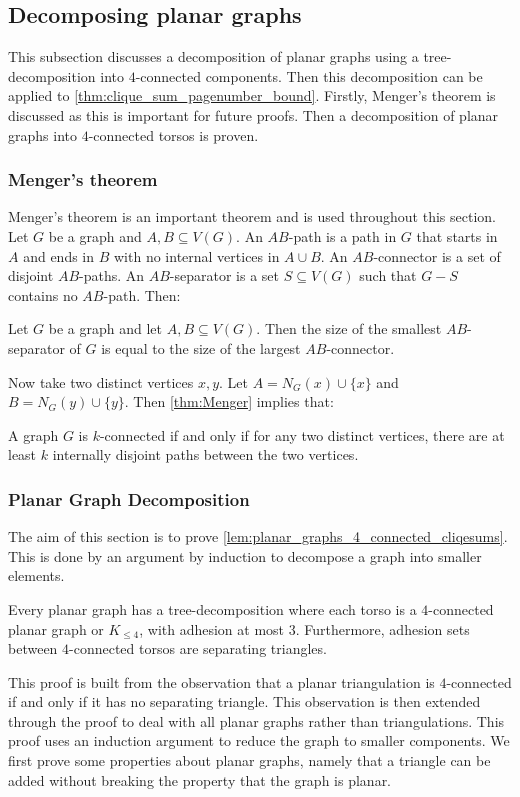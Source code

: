 \subsection{Decomposing planar graphs}
This subsection discusses a decomposition of planar graphs using a tree-decomposition into $4$-connected components. Then this decomposition can be applied to \cref{thm:clique_sum_pagenumber_bound}. Firstly, Menger's theorem is discussed as this is important for future proofs. Then a decomposition of planar graphs into $4$-connected torsos is proven.

\subsubsection{Menger's theorem}

Menger's theorem \cite{mengerZurAllgemeinenKurventheorie1927} is an important theorem and is used throughout this section. 
Let \(G\) be a graph and \(A, B \subseteq V(G)\). An \(AB\)-path is a path in \(G\) that starts in \(A\) and ends in \(B\) with no internal vertices in \(A \cup B\). An \(AB\)-connector is a set of disjoint \(AB\)-paths. An \(AB\)-separator is a set \(S \subseteq V(G)\) such that \(G - S\) contains no \(AB\)-path. Then:
\begin{theorem}\label{thm:Menger}
	Let $G$ be a graph and let $A, B \subseteq V(G)$. Then the size of the smallest \(AB\)-separator of \(G\) is equal to the size of the largest \(AB\)-connector.
\end{theorem}
Now take two distinct vertices \(x, y\). Let \(A = N_G(x) \cup \{x\} \) and \(B = N_G(y) \cup \{y\} \). Then \cref{thm:Menger} implies that:
\begin{theorem}\label{thm:Menger_Vertex}
	A graph \(G\) is \(k\)-connected if and only if for any two distinct vertices, there are at least \(k\) internally disjoint paths between the two vertices.
\end{theorem}

\subsubsection{Planar Graph Decomposition}
The aim of this section is to prove \cref{lem:planar_graphs_4_connected_cliqesums}. This is done by an argument by induction to decompose a graph into smaller elements. 
\begin{proposition}\label{lem:planar_graphs_4_connected_cliqesums}
	Every planar graph has a tree-decomposition where each torso is a \(4\)-connected planar graph or $K_{\leq 4}$, with adhesion at most \(3\). Furthermore, adhesion sets between $4$-connected torsos are separating triangles.
\end{proposition}
This proof is built from the observation that a planar triangulation is $4$-connected if and only if it has no separating triangle. This observation is then extended through the proof to deal with all planar graphs rather than triangulations. This proof uses an induction argument to reduce the graph to smaller components. We first prove some properties about planar graphs, namely that a triangle can be added without breaking the property that the graph is planar.

